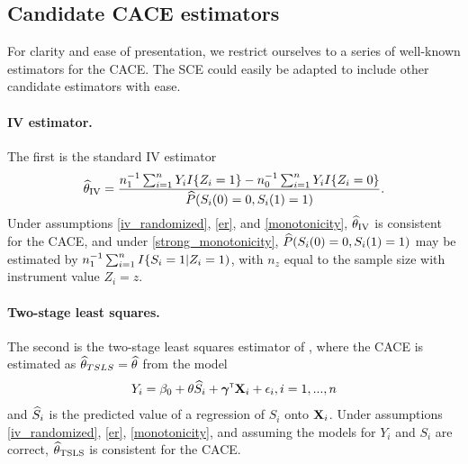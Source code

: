 \documentclass{article}
\def\siv{_{\text{IV}}}
\def\stsls{_{\text{TSLS}}}
\newtheorem{assumption}{Assumption}
\begin{document}




\subsection{Candidate CACE estimators}
For clarity and ease of presentation, we restrict ourselves to a series of well-known estimators for the CACE. The SCE could easily be adapted to include other candidate estimators with ease. 

\paragraph{IV estimator.} The first is the standard IV estimator
\begin{align}
    \thetahat\siv = \frac{n_1\inv\sum_{i=1}^nY_iI\{Z_i = 1\} - n_0\inv\sum_{i=1}^nY_iI\{Z_i = 0\}}{\Phat(S_i(0) = 0, S_i(1) = 1)}. \label{iv_est}
\end{align}
Under assumptions \ref{iv_randomized}, \ref{er}, and \ref{monotonicity}, $\thetahat\siv$ is consistent for the CACE, and under \ref{strong_monotonicity}, ${\widehat P}(S_i(0) = 0, S_i(1) = 1)$ may be estimated by $n_1^{-1}\sum_{i=1}^n I\{S_i = 1 | Z_i = 1)$, with $n_z$ equal to the sample size with instrument value $Z_i = z$.

\paragraph{Two-stage least squares.} The second is the two-stage least squares estimator of \cite{Angrist1995}, where the CACE is estimated as ${\widehat\theta}_{TSLS} = {\widehat\theta}$ from the model
\begin{align}
    Y_i = \beta_0 + \theta {\widehat S}_i + \boldsymbol{\gamma}^{{\sf \scriptscriptstyle{T}}}{\bf X}_i + \epsilon_i, i = 1, ..., n
\end{align}
and ${\widehat S}_i$ is the predicted value of a regression of $S_i$ onto ${\bf X}_i$. Under assumptions \ref{iv_randomized}, \ref{er}, \ref{monotonicity}, and assuming the models for $Y_i$ and $S_i$ are correct, $\thetahat\stsls$ is consistent for the CACE.
\end{document}
